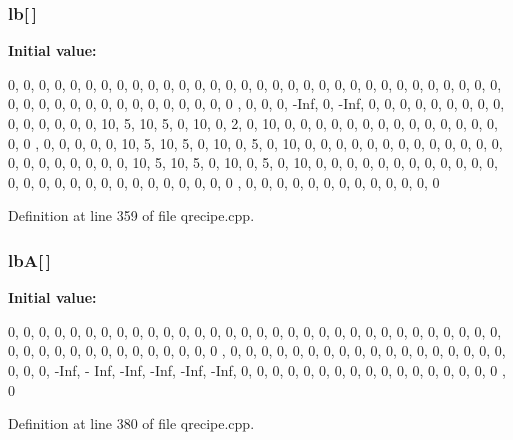 \subsubsection[{lb}]{ {\bf lb}[$\,$]}\label{qrecipe_8cpp_a3d4162b20ecb6df369f34d3c822acc71}
{\bfseries Initial value:}
\begin{DoxyCode}
 {0, 0, 0, 0, 0, 0, 0, 0, 0, 0, 0, 0, 0, 0, 0, 0, 0, 0, 0, 0, 0, 0,
        0, 0, 0, 0, 0, 0, 0, 0, 0, 0, 0, 0, 0, 0, 0, 0, 0, 0, 0, 0, 0, 0, 0, 0, 0
      ,
        0, 0, 0, -Inf, 0, -Inf, 0, 0, 0, 0, 0, 0, 0, 0, 0, 0, 0, 0, 0, 0, 0, 10, 
      5,
        10, 5, 0, 10, 0, 2, 0, 10, 0, 0, 0, 0, 0, 0, 0, 0, 0, 0, 0, 0, 0, 0, 0, 0
      ,
        0, 0, 0, 0, 0, 10, 5, 10, 5, 0, 10, 0, 5, 0, 10, 0, 0, 0, 0, 0, 0, 0, 0, 
      0,
        0, 0, 0, 0, 0, 0, 0, 0, 0, 0, 0, 0, 10, 5, 10, 5, 0, 10, 0, 5, 0, 10, 0, 
      0,
        0, 0, 0, 0, 0, 0, 0, 0, 0, 0, 0, 0, 0, 0, 0, 0, 0, 0, 0, 0, 0, 0, 0, 0, 0
      ,
        0, 0, 0, 0, 0, 0, 0, 0, 0, 0, 0, 0, 0}
\end{DoxyCode}


Definition at line 359 of file qrecipe.cpp.

\subsubsection[{lbA}]{ {\bf lbA}[$\,$]}\label{qrecipe_8cpp_aaa7409f5cbcd433f0360489cfacaa99d}
{\bfseries Initial value:}
\begin{DoxyCode}
 {0, 0, 0, 0, 0, 0, 0, 0, 0, 0, 0, 0, 0, 0, 0, 0, 0, 0, 0, 0, 0,
        0, 0, 0, 0, 0, 0, 0, 0, 0, 0, 0, 0, 0, 0, 0, 0, 0, 0, 0, 0, 0, 0, 0, 0, 0
      ,
        0, 0, 0, 0, 0, 0, 0, 0, 0, 0, 0, 0, 0, 0, 0, 0, 0, 0, 0, 0, 0, -Inf, -
      Inf,
        -Inf, -Inf, -Inf, -Inf, 0, 0, 0, 0, 0, 0, 0, 0, 0, 0, 0, 0, 0, 0, 0, 0, 0
      ,
        0}
\end{DoxyCode}


Definition at line 380 of file qrecipe.cpp.

